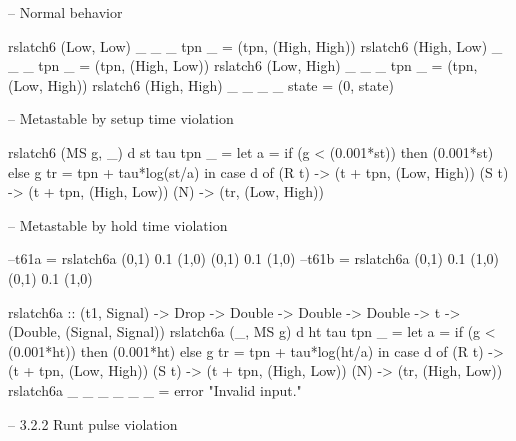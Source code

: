 -- Normal behavior

rslatch6 (Low, Low) _ _ _ tpn _     = (tpn, (High, High))
rslatch6 (High, Low) _ _ _ tpn _    = (tpn, (High, Low))
rslatch6 (Low, High) _ _ _ tpn _    = (tpn, (Low, High))
rslatch6 (High, High) _ _ _ _ state = (0, state)

-- Metastable by setup time violation

rslatch6 (MS g, _) d st tau tpn _ =
  let
    a = if (g < (0.001*st)) then (0.001*st) else g
    tr = tpn + tau*log(st/a) in
      case d of
           (R t) -> (t + tpn, (Low, High))
           (S t) -> (t + tpn, (High, Low))
           (N)   -> (tr, (Low, High))
         
-- Metastable by hold time violation

--t61a = rslatch6a (0,1) 0.1 (1,0) (0,1) 0.1 (1,0)
--t61b = rslatch6a (0,1) 0.1 (1,0) (0,1) 0.1 (1,0)

rslatch6a :: (t1, Signal) -> Drop -> Double -> Double -> Double -> t
             -> (Double, (Signal, Signal))
rslatch6a (_, MS g) d ht tau tpn _ =
  let
    a = if (g < (0.001*ht)) then (0.001*ht) else g
    tr = tpn + tau*log(ht/a) in
      case d of
           (R t) -> (t + tpn, (Low, High))
           (S t) -> (t + tpn, (High, Low))
           (N)   -> (tr, (High, Low))
rslatch6a _ _ _ _ _ _  = error "Invalid input."

-- 3.2.2 Runt pulse violation

